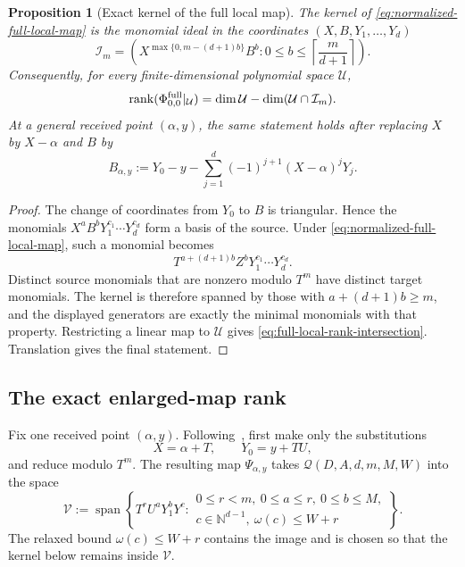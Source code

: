 \documentclass[11pt,letterpaper]{article}
\newtheorem{proposition}[proposition]{Proposition}
\theoremstyle{definition}
\newcommand{\N}{\mathbb{N}}
\newcommand{\rank}{\operatorname{rank}}
\newcommand{\Qspace}{\mathcal{Q}}
\begin{document}
\begin{proposition}[Exact kernel of the full local map]
\label{prop:full-local-kernel}
The kernel of \eqref{eq:normalized-full-local-map} is the monomial ideal in
the coordinates \((X,B,Y_1,\ldots,Y_d)\)
\begin{equation}
  \mathcal I_m=
  \left(
    X^{\max\{0,m-(d+1)b\}}B^b:
    0\leq b\leq\left\lceil\frac{m}{d+1}\right\rceil
  \right).
  \label{eq:full-local-kernel-ideal}
\end{equation}
Consequently, for every finite-dimensional polynomial space
\(\mathcal U\),
\begin{equation}
  \rank(\Phi^{\rm full}_{0,0}|_{\mathcal U})
  =\dim\mathcal U-\dim(\mathcal U\cap\mathcal I_m).
  \label{eq:full-local-rank-intersection}
\end{equation}
At a general received point \((\alpha,y)\), the same statement holds after
replacing \(X\) by \(X-\alpha\) and \(B\) by
\[
  B_{\alpha,y}:=
  Y_0-y-\sum_{j=1}^{d}(-1)^{j+1}(X-\alpha)^jY_j.
\]
\end{proposition}

\begin{proof}
The change of coordinates from \(Y_0\) to \(B\) is triangular.  Hence the
monomials \(X^aB^bY_1^{c_1}\cdots Y_d^{c_d}\) form a basis of the source.
Under \eqref{eq:normalized-full-local-map}, such a monomial becomes
\[
  T^{a+(d+1)b}Z^bY_1^{c_1}\cdots Y_d^{c_d}.
\]
Distinct source monomials that are nonzero modulo \(T^m\) have distinct target
monomials.  The kernel is therefore spanned by those with
\(a+(d+1)b\geq m\), and the displayed generators are exactly the minimal
monomials with that property.  Restricting a linear map to \(\mathcal U\)
gives \eqref{eq:full-local-rank-intersection}.  Translation gives the final
statement.
\end{proof}

\subsection{The exact enlarged-map rank}

Fix one received point \((\alpha,y)\).  Following~\cite{BCPZZ26}, first make
only the substitutions
\begin{equation}
  X=\alpha+T,
  \qquad
  Y_0=y+TU,
  \label{eq:rank-first-substitution}
\end{equation}
and reduce modulo \(T^m\).  The resulting map \(\Psi_{\alpha,y}\) takes
\(\Qspace(D,A,d,m,M,W)\) into the space
\begin{equation}
  \mathcal V
  :=
  \operatorname{span}\left\{
    T^rU^aY_1^bY^c:
    \begin{array}{l}
      0\leq r<m,\ 0\leq a\leq r,\ 0\leq b\leq M,\\
      c\in\N^{d-1},\ \omega(c)\leq W+r
    \end{array}
  \right\}.
  \label{eq:rank-space-v}
\end{equation}
The relaxed bound \(\omega(c)\leq W+r\) contains the image and is chosen so
that the kernel below remains inside \(\mathcal V\).
\end{document}
